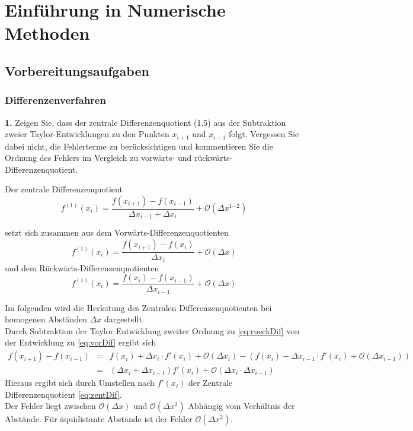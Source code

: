 \documentclass[Protokollheft.tex]{subfiles}
\begin{document}
\chapter{Einführung in Numerische Methoden}

\section{Vorbereitungsaufgaben}
    {\subsection{Differenzenverfahren}}

    \begin{framed}
	\noindent \textbf{1.} Zeigen Sie, dass der zentrale Differenzenquotient (1.5) aus der Subtraktion zweier Taylor-Entwicklungen zu den Punkten $x_{i+1}$ und $x_{i-1}$ folgt. Vergessen Sie dabei nicht, die Fehlerterme zu berücksichtigen und kommentieren Sie die Ordnung des Fehlers im Vergleich zu vorwärts- und rückwärts-Differenzenquotient.\label{exer:diffquot}
\end{framed}

Der zentrale Differenzenquotient 
\begin{equation}
\label{eq:zentDif}
f^{(1)}(x_i) = \frac{f(x_{i+1})-f(x_{i-1})}{\Delta x_{i-1}+\Delta x_i} + \mathcal{O}(\Delta x^{1\cdots2})
\end{equation}

setzt sich zusammen aus dem Vorwärts-Differenzenquotienten
\begin{equation}
\label{eq:vorDif}
f^{(1)}(x_i) = \frac{f(x_{i+1})-f(x_{i})}{\Delta x_{i}} + \mathcal{O}(\Delta x)
\end{equation}
und dem Rückwärts-Differenzenquotienten
\begin{equation}
\label{eq:rueckDif}
f^{(1)}(x_i) = \frac{f(x_{i})-f(x_{i-1})}{\Delta x_{i-1}} + \mathcal{O}(\Delta x)
\end{equation}

Im folgenden wird die Herleitung des Zentralen Differenzenquotienten bei homogenen Abständen $\Delta x$ dargestellt.\\
Durch Subtraktion der Taylor Entwicklung zweiter Ordnung zu \ref{eq:rueckDif} von der Entwicklung zu \ref{eq:vorDif} ergibt sich 
\begin{align}
\label{eq:taylor}
f(x_{i+1})-f(x_{i-1})& = &f(x_i)+\Delta x_i \cdot f'(x_i) + \mathcal{O} (\Delta x_i) 
- (f(x_i) - \Delta x_{i-1}\cdot f'(x_i) + \mathcal{O} (\Delta x_{i-1})) \nonumber \\	
& = & (\Delta x_i + \Delta x_{i-1}) f'(x_i) + \mathcal{O} (\Delta x_i \cdot \Delta x_{i-1})
\end{align}
Hieraus ergibt sich durch Umstellen nach $f'(x_i)$ der Zentrale Differenzenquotient \ref{eq:zentDif}. \\
Der Fehler liegt zwischen $\mathcal{O}(\Delta x)$ und $\mathcal{O} (\Delta x^2)$ Abhängig vom Verhältnis der Abstände. Für äquidistante Abstände ist der Fehler $\mathcal{O} (\Delta x^2)$.
\end{document}
